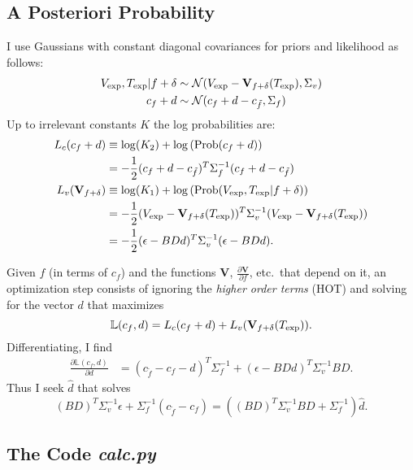 \documentclass[11pt]{article}
\newcommand{\normal}[2]{{\cal N}(#1,#2)}
\newcommand{\normalexp}[3]{ -\frac{1}{2}
      (#1 - #2)^T #3^{-1} (#1 - #2) }
\newcommand{\fnom}{\tilde f}
\newcommand{\Prob}{\text{Prob}}
\newcommand{\partiald}[2]{\frac{\partial #1}{\partial #2}}
\newcommand\Vt{\mathbf{V}}
\newcommand\vexp{V_{\rm{exp}}}
\newcommand\texp{T_{\rm{exp}}}
\newcommand\cf{c_f}
\newcommand\DVDf{\partiald{\Vt}{f}}
\newcommand\Lbb{\mathbb{L}}
\begin{document}
\subsection{A Posteriori Probability}
\label{sec:app}

I use Gaussians with constant diagonal covariances for priors and
likelihood as follows:
\begin{align}
\vexp,\texp | f+\delta &\sim
\normal{\vexp-\Vt_{f+\delta}(\texp)}{\Sigma_v} \\
\cf+d &\sim \normal{\cf+d - c_{\fnom}}{\Sigma_f}
\end{align}
Up to irrelevant constants $K$ the log probabilities are:
\begin{align}
  L_c(\cf+d) & \equiv \log(K_2) + \log \left(\Prob(\cf+d) \right)\\
  & = \normalexp{\cf+d}{c_{\fnom}}{\Sigma_f}\\
  L_v(\Vt_{f+\delta}) & \equiv \log(K_1) + \log
  \left(\Prob(\vexp,\texp | f+\delta) \right)
  \nonumber \\
  & = \normalexp{\vexp}{\Vt_{f+\delta}(\texp)}{\Sigma_v} \\
  &= \normalexp{\epsilon}{BDd}{\Sigma_v}.
\end{align}

Given $f$ (in terms of $\cf$) and the functions $\Vt$, $\DVDf$, etc.\
that depend on it, an optimization step consists of ignoring the
\emph{higher order terms} (HOT) and solving for the vector $d$ that
maximizes
\begin{equation}
  \label{eq:L}
  \Lbb(\cf,d) = L_c(\cf + d) + L_v(\Vt_{f+\delta}(\texp)).
\end{equation}
Differentiating, I find
\begin{align*}
  \partiald{\Lbb(\cf,d)}{d} &= (c_{\fnom} - \cf - d)^T
  \Sigma^{-1}_f + (\epsilon - BDd)^T \Sigma_v^{-1}BD.
\end{align*}
Thus I seek $\hat d$ that solves
\begin{equation}
  \label{eq:dmap}
  (BD)^T\Sigma_v^{-1}\epsilon + \Sigma_f^{-1} (c_{\tilde f} - \cf) = 
  \left((BD)^T\Sigma_v^{-1}BD + \Sigma_f^{-1} \right) \hat d.
\end{equation}

\subsection{The Code \emph{calc.py}}
\label{sec:code}
\end{document}
